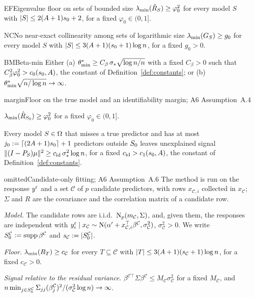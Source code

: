 \begin{assumption}{EF}{Eigenvalue floor on sets of bounded size}
$\lambda_{\min}(\hat R_S)\ge\varphi_0^2$ for every model $S$ with $\lvert S\rvert\le2(A+1)s_0+2$, for a fixed $\varphi_0\in(0,1]$.
\end{assumption}

\begin{assumption}{NC}{No near-exact collinearity among sets of logarithmic size}
$\lambda_{\min}(G_S)\ge g_0$ for every model $S$ with $\lvert S\rvert\le3(A+1)(s_0+1)\log n$, for a fixed $g_0>0$.
\end{assumption}

\begin{assumption}{BM}{Beta-min}
Either (a) $\theta^*_{\min}\ge C_\beta\,\sigma_*\sqrt{\log n/n}$ with a fixed $C_\beta>0$ such that $C_\beta^2\varphi_0^2>c_0(s_0,A)$, the constant
of Definition~\ref{def:constants}; or (b) $\theta^*_{\min}\sqrt{n/\log n}\to\infty$.
\end{assumption}

\begin{assumption}{margin}{Floor on the true model and an identifiability margin; A6 Assumption~A.4}
\begin{asmitems}
  \item $\lambda_{\min}(\hat R_{S_0})\ge\varphi_0^2$ for a fixed $\varphi_0\in(0,1]$.
  \item Every model $S\in\Omega$ that misses a true predictor and has at most $j_0:=\lceil(2A+1)s_0\rceil+1$ predictors
    outside $S_0$ leaves unexplained signal $\lVert (I-P_S)\mu\rVert^2\ge c_{\mathrm{id}}\,\sigma_*^2\log n$, for a fixed
    $c_{\mathrm{id}}>c_1(s_0,A)$, the constant of Definition~\ref{def:constants}.
\end{asmitems}
\end{assumption}

\begin{assumption}{omitted}{Candidate-only fitting; A6 Assumption~A.6}
The method is run on the response $y^{\mathrm r}$ and a set $\mathcal C$ of $p$ candidate predictors, with rows $x_{\mathcal C,i}$
collected in $x_{\mathcal C}$; $\Sigma$ and $R$ are the covariance and the correlation matrix of a candidate row.
\begin{asmitems}
  \item \emph{Model.} The candidate rows are i.i.d.\ $\mathrm{N}_p(m_{\mathcal C},\Sigma)$, and, given them, the responses are
    independent with $y^{\mathrm r}_i\mid x_{\mathcal C}\sim\mathrm{N}(\alpha'+x_{\mathcal C,i}^\top\beta^{\mathcal C},\sigma^2_{\mathcal C})$,
    $\sigma^2_{\mathcal C}>0$. We write $S_0^{\mathcal C}:=\operatorname{supp}\beta^{\mathcal C}$ and $s_{\mathcal C}:=\lvert S_0^{\mathcal C}\rvert$.
  \item \emph{Floor.} $\lambda_{\min}(R_T)\ge c_{\mathcal C}$ for every $T\subseteq\mathcal C$ with
    $\lvert T\rvert\le3(A+1)(s_{\mathcal C}+1)\log n$, for a fixed $c_{\mathcal C}>0$.
  \item \emph{Signal relative to the residual variance.} $\beta^{\mathcal C\top}\Sigma\beta^{\mathcal C}\le
    M_{\mathcal C}\sigma^2_{\mathcal C}$ for a fixed $M_{\mathcal C}$, and $n\min_{j\in S_0^{\mathcal C}}\Sigma_{jj}(\beta^{\mathcal
    C}_j)^2/(\sigma^2_{\mathcal C}\log n)\to\infty$.
\end{asmitems}
\end{assumption}

